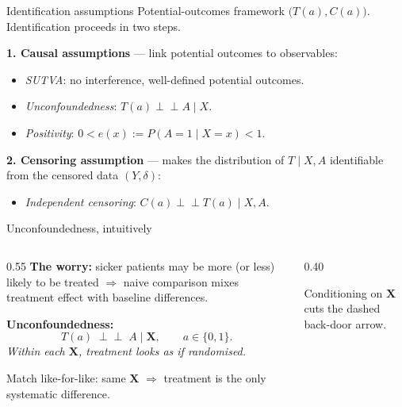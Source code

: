 \documentclass[10pt,aspectratio=169]{beamer}
\newcommand{\indep}{\perp\!\!\!\perp}
\begin{document}
\begin{frame}{Identification assumptions}
Potential-outcomes framework $\bigl(T(a), C(a)\bigr)$. Identification proceeds in two steps.

\bigskip

\textbf{1. Causal assumptions} --- link potential outcomes to observables:
\begin{itemize}
  \item \textit{SUTVA}: no interference, well-defined potential outcomes.
  \item \textit{Unconfoundedness}: $T(a) \indep A \mid X$.
  \item \textit{Positivity}: $0 < e(x) := P(A{=}1 \mid X{=}x) < 1$.
\end{itemize}


\vspace{0.6cm}
\textbf{2. Censoring assumption} --- makes the distribution of $T \mid X, A$ identifiable from the censored data $(Y,\delta)$:
\begin{itemize}
  \item \textit{Independent censoring}: $C(a) \indep T(a) \mid X, A$.
\end{itemize}


\end{frame}

\begin{frame}{Unconfoundedness, intuitively}
\begin{columns}[T,onlytextwidth]
\begin{column}{0.55\textwidth}
\vspace{0.3cm}
\textbf{The worry:} sicker patients may be more (or less) likely to be treated $\Rightarrow$ naive comparison mixes treatment effect with baseline differences.

\bigskip

\textbf{Unconfoundedness:}
\[
T(a) \;\indep\; A \;\big|\; \bm{X}, \qquad a \in \{0,1\}.
\]
\emph{Within each $\bm{X}$, treatment looks as if randomised.}

\bigskip

\alert{Match like-for-like:} same $\bm{X}$ $\Rightarrow$ treatment is the only systematic difference.
\end{column}
\begin{column}{0.40\textwidth}
\centering
\vspace{0.5cm}

\bigskip
{\footnotesize Conditioning on $\bm{X}$ cuts the dashed back-door arrow.}
\end{column}
\end{columns}
\end{frame}
\end{document}
